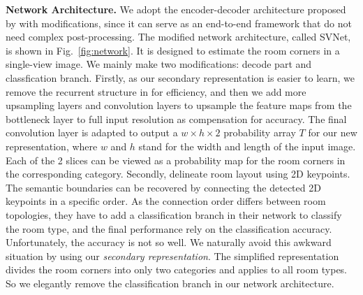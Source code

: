 \noindent\textbf{Network Architecture.} We adopt the encoder-decoder architecture proposed by \cite{LeeRoomNet17} with modifications,  since it can serve as an end-to-end framework that do not need complex post-processing. 
%
The modified network architecture, called SVNet, is shown in Fig.~\ref{fig:network}. It is designed to estimate the room corners in a single-view image. 
We mainly make two modifications: decode part and classfication branch. Firstly, as our secondary representation is easier to learn, we remove the recurrent structure in \cite{LeeRoomNet17} for efficiency, and then we add more upsampling layers and convolution layers to upsample the feature maps from the bottleneck layer to full input resolution as compensation for accuracy. The final convolution layer is adapted to output a $w \times h \times 2$ probability array $T$ for our new representation, where $w$ and $h$ stand for the width and length of the input image. Each of the 2 slices can be viewed as a probability map for the room corners in the corresponding category. Secondly, 
\cite{LeeRoomNet17} delineate room layout using 2D keypoints. The semantic boundaries can be recovered by connecting the detected 2D keypoints in a specific order. As the connection order differs between room topologies, they have to add a classification branch in their network to classify the room type, and the final performance rely on the classification accuracy. Unfortunately, the accuracy is not so well. We naturally avoid this awkward situation by using our \emph{secondary representation}. The simplified representation divides the room corners into only two categories and applies to all room types. So we elegantly remove the classification branch in our network architecture.


